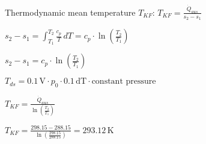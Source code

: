 Thermodynamic mean temperature \( T_{KF} \):  
\( T_{KF} = \frac{\dot{Q}_{aus}}{s_{2} - s_{1}} \)  

\( s_{2} - s_{1} = \int_{T_1}^{T_2} \frac{c_p}{T} \, dT = c_p \cdot \ln \left( \frac{T_2}{T_1} \right) \)  

\( s_{2} - s_{1} = c_p \cdot \ln \left( \frac{T_2}{T_1} \right) \)  

\( T_{ds} = 0.1 \, \text{V} \cdot p_0 \cdot 0.1 \, \text{dT} \cdot \text{constant pressure} \)  

\( T_{KF} = \frac{\dot{Q}_{aus}}{\ln \left( \frac{T_2}{T_1} \right)} \)  

\( T_{KF} = \frac{298.15 - 288.15}{\ln \left( \frac{298.15}{288.15} \right)} = 293.12 \, \text{K} \)